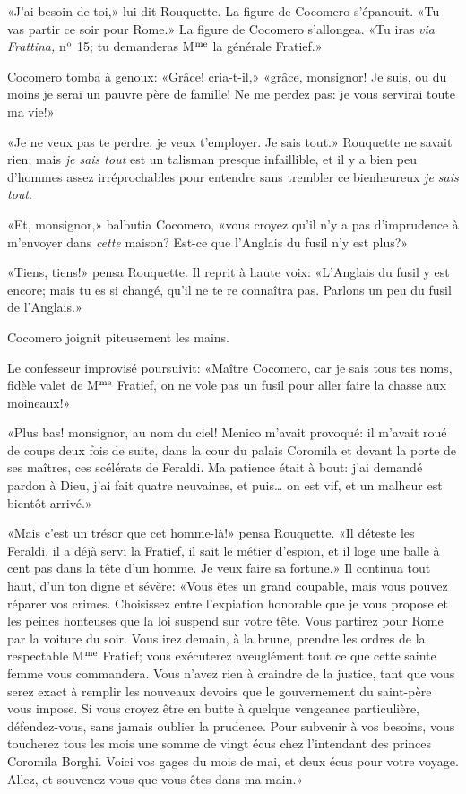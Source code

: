 \enlargethispage{\baselineskip}

«J'ai besoin de toi,» lui dit Rouquette. La figure de Cocomero s'épanouit. «Tu vas partir ce soir pour Rome.» La figure de Cocomero s'allongea. «Tu iras \emph{via Frattina,} n$\textsuperscript{o}$ 15; tu demanderas M$\textsuperscript{me}$ la générale Fratief.»

Cocomero tomba à genoux: «Grâce! cria-t-il,» «grâce, monsignor! Je suis, ou du moins je serai un pauvre père de famille! Ne me perdez pas: je vous servirai toute ma vie!»

«Je ne veux pas te perdre, je veux t'employer. Je sais tout.» Rouquette ne savait rien; mais \emph{je sais tout} est un talisman presque infaillible, et il y a bien peu d'hommes assez irréprochables pour entendre sans trembler ce bienheureux \emph{je sais tout}.

«Et, monsignor,» balbutia Cocomero, «vous croyez qu'il n'y a pas d'imprudence à m'envoyer dans \emph{cette} maison? Est-ce que l'Anglais du fusil n'y est plus?»

«Tiens, tiens!» pensa Rouquette. Il reprit à haute voix: «L'Anglais du fusil y est encore; mais tu es si changé, qu'il ne te re connaîtra pas. Parlons un peu du fusil de l'Anglais.»

Cocomero joignit piteusement les mains.

Le confesseur improvisé poursuivit: «Maître Cocomero, car je sais tous tes noms, fidèle valet de M$\textsuperscript{me}$ Fratief, on ne vole pas un fusil pour aller faire la chasse aux moineaux!»

«Plus bas! monsignor, au nom du ciel! Menico m'avait provoqué: il m'avait roué de coups deux fois de suite, dans la cour du palais Coromila et devant la porte de ses maîtres, ces scélérats de Feraldi. Ma patience était à bout: j'ai demandé pardon à Dieu, j'ai fait quatre neuvaines, et puis\ldots{} on est vif, et un malheur est bientôt arrivé.»

«Mais c'est un trésor que cet homme-là!» pensa Rouquette. «Il déteste les Feraldi, il a déjà servi la Fratief, il sait le métier d'espion, et il loge une balle à cent pas dans la tête d'un homme. Je veux faire sa fortune.» Il continua tout haut, d'un ton digne et sévère: «Vous êtes un grand coupable, mais vous pouvez réparer vos crimes. Choisissez entre l'expiation honorable que je vous propose et les peines honteuses que la loi suspend sur votre tête. Vous partirez pour Rome par la voiture du soir. Vous irez demain, à la brune, prendre les ordres de la respectable M$\textsuperscript{me}$ Fratief; vous exécuterez aveuglément tout ce que cette sainte femme vous commandera. Vous n'avez rien à craindre de la justice, tant que vous serez exact à remplir les nouveaux devoirs que le gouvernement du saint-père vous impose. Si vous croyez être en butte à quelque vengeance particulière, défendez-vous, sans jamais oublier la prudence. Pour subvenir à vos besoins, vous toucherez tous les mois une somme de vingt écus chez l'intendant des princes Coromila Borghi. Voici vos gages du mois de mai, et deux écus pour votre voyage. Allez, et souvenez-vous que vous êtes dans ma main.»

